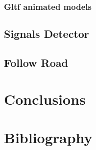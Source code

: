 \documentclass[11pt]{article}
\begin{document}
\subsubsection{Gltf animated models}

\subsection{Signals Detector}
\subsection{Follow Road}

\section{Conclusions}

\section{Bibliography}
\end{document}

